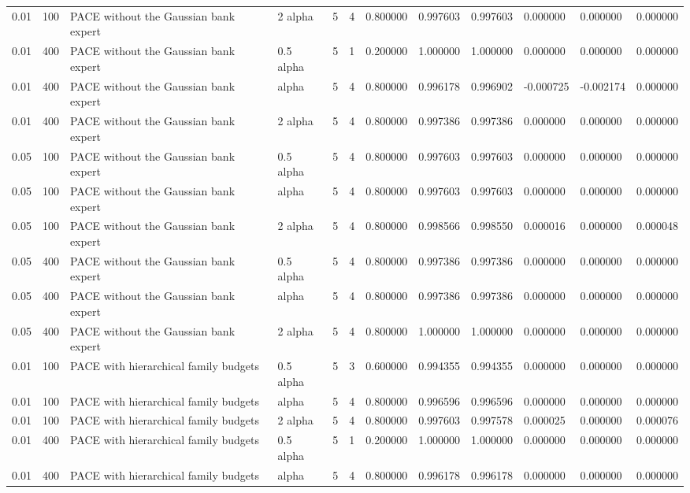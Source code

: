 \begin{tabular}{llllllllllll}
0.01 & 100 & PACE without the Gaussian bank expert & 2 alpha & 5 & 4 & 0.800000 & 0.997603 & 0.997603 & 0.000000 & 0.000000 & 0.000000 \\
0.01 & 400 & PACE without the Gaussian bank expert & 0.5 alpha & 5 & 1 & 0.200000 & 1.000000 & 1.000000 & 0.000000 & 0.000000 & 0.000000 \\
0.01 & 400 & PACE without the Gaussian bank expert & alpha & 5 & 4 & 0.800000 & 0.996178 & 0.996902 & -0.000725 & -0.002174 & 0.000000 \\
0.01 & 400 & PACE without the Gaussian bank expert & 2 alpha & 5 & 4 & 0.800000 & 0.997386 & 0.997386 & 0.000000 & 0.000000 & 0.000000 \\
0.05 & 100 & PACE without the Gaussian bank expert & 0.5 alpha & 5 & 4 & 0.800000 & 0.997603 & 0.997603 & 0.000000 & 0.000000 & 0.000000 \\
0.05 & 100 & PACE without the Gaussian bank expert & alpha & 5 & 4 & 0.800000 & 0.997603 & 0.997603 & 0.000000 & 0.000000 & 0.000000 \\
0.05 & 100 & PACE without the Gaussian bank expert & 2 alpha & 5 & 4 & 0.800000 & 0.998566 & 0.998550 & 0.000016 & 0.000000 & 0.000048 \\
0.05 & 400 & PACE without the Gaussian bank expert & 0.5 alpha & 5 & 4 & 0.800000 & 0.997386 & 0.997386 & 0.000000 & 0.000000 & 0.000000 \\
0.05 & 400 & PACE without the Gaussian bank expert & alpha & 5 & 4 & 0.800000 & 0.997386 & 0.997386 & 0.000000 & 0.000000 & 0.000000 \\
0.05 & 400 & PACE without the Gaussian bank expert & 2 alpha & 5 & 4 & 0.800000 & 1.000000 & 1.000000 & 0.000000 & 0.000000 & 0.000000 \\
0.01 & 100 & PACE with hierarchical family budgets & 0.5 alpha & 5 & 3 & 0.600000 & 0.994355 & 0.994355 & 0.000000 & 0.000000 & 0.000000 \\
0.01 & 100 & PACE with hierarchical family budgets & alpha & 5 & 4 & 0.800000 & 0.996596 & 0.996596 & 0.000000 & 0.000000 & 0.000000 \\
0.01 & 100 & PACE with hierarchical family budgets & 2 alpha & 5 & 4 & 0.800000 & 0.997603 & 0.997578 & 0.000025 & 0.000000 & 0.000076 \\
0.01 & 400 & PACE with hierarchical family budgets & 0.5 alpha & 5 & 1 & 0.200000 & 1.000000 & 1.000000 & 0.000000 & 0.000000 & 0.000000 \\
0.01 & 400 & PACE with hierarchical family budgets & alpha & 5 & 4 & 0.800000 & 0.996178 & 0.996178 & 0.000000 & 0.000000 & 0.000000 \\

\end{tabular}
